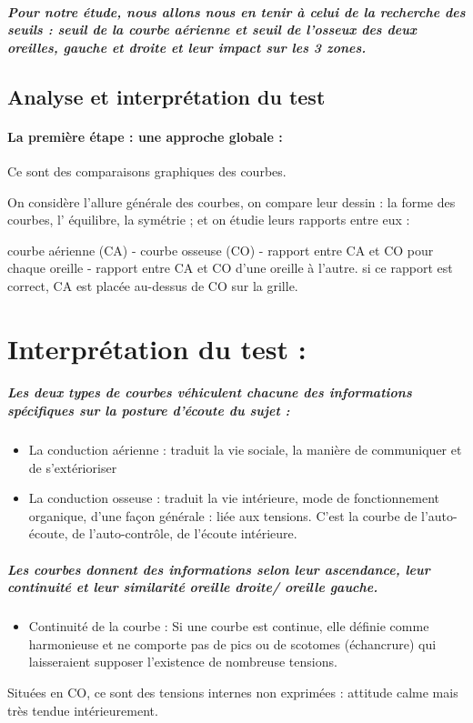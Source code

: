 \subparagraph*{Pour notre étude, nous allons nous en tenir à celui de la recherche
des seuils : seuil de la courbe aérienne et seuil de l'osseux des
deux oreilles, gauche et droite et leur impact sur les 3 zones.}


\subsection*{Analyse et interprétation du test}
\paragraph{La première étape : une approche globale : }

Ce sont des comparaisons graphiques des courbes. 

On considère l'allure générale des courbes, on compare leur dessin
: la forme des courbes, l' équilibre, la symétrie ; et on étudie leurs
rapports entre eux : 

courbe aérienne (CA) - courbe osseuse (CO) - rapport entre CA et CO
pour chaque oreille - rapport entre CA et CO d\textquoteright une
oreille à l'autre. si ce rapport est correct, CA est placée au-dessus
de CO sur la grille.
\section{Interprétation du test : }


\subparagraph{Les deux types de courbes véhiculent chacune des informations spécifiques
sur la posture d'écoute du sujet : }
\begin{itemize}
\item La conduction aérienne : traduit la vie sociale, la manière de communiquer
et de s'extérioriser
\item La conduction osseuse : traduit la vie intérieure, mode de fonctionnement
organique, d'une façon générale : liée aux tensions. C'est la courbe
de l\textquoteright auto-écoute, de l\textquoteright auto-contrôle,
de l'écoute intérieure.
\end{itemize}

\subparagraph{Les courbes donnent des informations selon leur ascendance, leur
continuité et leur similarité oreille droite/ oreille gauche.}
\begin{itemize}
\item Continuité de la courbe : Si une courbe est continue, elle définie
comme harmonieuse et ne comporte pas de pics ou de scotomes (échancrure)  qui laisseraient
supposer l'existence de nombreuse tensions.
\end{itemize}
Situées en CO, ce sont des tensions internes non exprimées : attitude
calme mais très tendue intérieurement.

